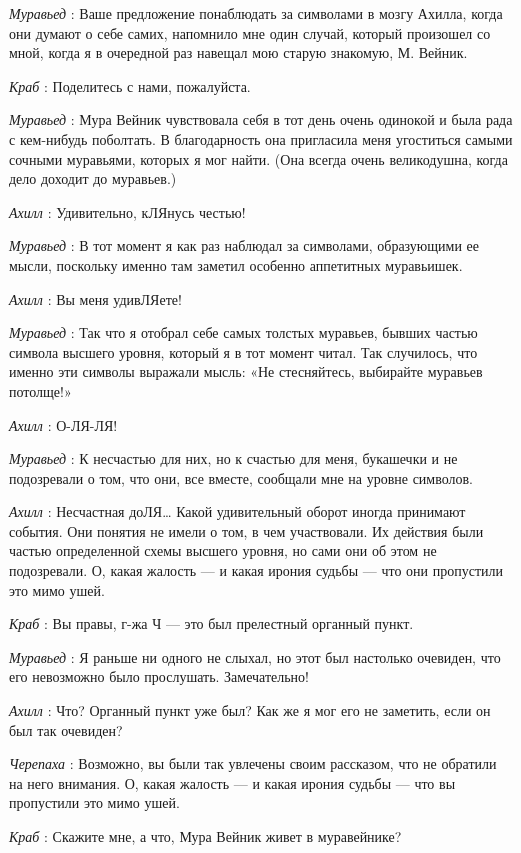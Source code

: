 \documentclass[../main.tex]{subfiles}
\begin{document}
\begin{dialogue}
\emph{Муравьед} : Ваше предложение понаблюдать за символами в мозгу Ахилла, когда они думают о себе самих, напомнило мне один случай, который произошел со мной, когда я в очередной раз навещал мою старую знакомую, М. Вейник.

\emph{Краб} : Поделитесь с нами, пожалуйста.

\emph{Муравьед} : Мура Вейник чувствовала себя в тот день очень одинокой и была рада с кем-нибудь поболтать. В благодарность она пригласила меня угоститься самыми сочными муравьями, которых я мог найти. (Она всегда очень великодушна, когда дело доходит до муравьев.)

\emph{Ахилл} : Удивительно, кЛЯнусь честью!

\emph{Муравьед} : В тот момент я как раз наблюдал за символами, образующими ее мысли, поскольку именно там заметил особенно аппетитных муравьишек.

\emph{Ахилл} : Вы меня удивЛЯете!

\emph{Муравьед} : Так что я отобрал себе самых толстых муравьев, бывших частью символа высшего уровня, который я в тот момент читал. Так случилось, что именно эти символы выражали мысль: «Не стесняйтесь, выбирайте муравьев потолще!»

\emph{Ахилл} : О-ЛЯ-ЛЯ!

\emph{Муравьед} : К несчастью для них, но к счастью для меня, букашечки и не подозревали о том, что они, все вместе, сообщали мне на уровне символов.

\emph{Ахилл} : Несчастная доЛЯ\ldots{} Какой удивительный оборот иногда принимают события. Они понятия не имели о том, в чем участвовали. Их действия были частью определенной схемы высшего уровня, но сами они об этом не подозревали. О, какая жалость --- и какая ирония судьбы --- что они пропустили это мимо ушей.

\emph{Краб} : Вы правы, г-жа Ч --- это был прелестный органный пункт.

\emph{Муравьед} : Я раньше ни одного не слыхал, но этот был настолько очевиден, что его невозможно было прослушать. Замечательно!

\emph{Ахилл} : Что? Органный пункт уже был? Как же я мог его не заметить, если он был так очевиден?

\emph{Черепаха} : Возможно, вы были так увлечены своим рассказом, что не обратили на него внимания. О, какая жалость --- и какая ирония судьбы --- что вы пропустили это мимо ушей.

\emph{Краб} : Скажите мне, а что, Мура Вейник живет в муравейнике?


\end{dialogue}
\end{document}
